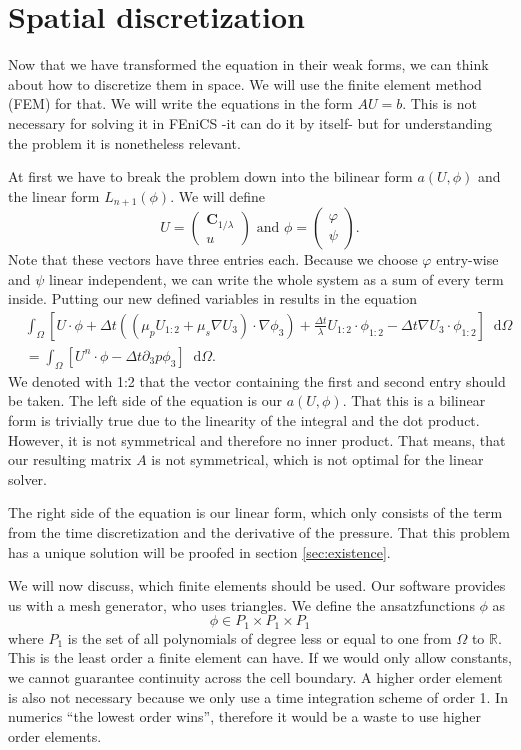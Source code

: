 \documentclass[12pt,a4paper,twoside, open=right]{scrreprt}
\theoremstyle{definition}
\theoremstyle{plain}
\newcommand{\rr}{\mathbb{R}}
\newcommand{\bfC}{\bm{C}}
\newcommand{\D}{\mathop{}\!\mathrm{d}}
\begin{document}
\section{Spatial discretization}
Now that we have transformed the equation in their weak forms, we can think about how to discretize them in space. We will use the finite element method (FEM) for that. We will write the equations in the form $AU=b$. This is not necessary for solving it in FEniCS -it can do it by itself- but for understanding the problem it is nonetheless relevant. 
\par 
At first we have to break the problem down into the bilinear form $a(U,\phi)$ and the linear form $L_{n+1}(\phi)$. We will define 
\begin{equation}
   U=\begin{pmatrix}
   \bfC_{1/\lambda}\\u
   \end{pmatrix} \text{ and } 
   \phi=\begin{pmatrix}
   \varphi\\\psi
   \end{pmatrix}.
\end{equation}
Note that these vectors have three entries each. Because we choose $\varphi$ entry-wise and $\psi$ linear independent, we can write the whole system as a sum of every term inside. Putting our new defined variables in results in the equation
\begin{align}
    &\int_\Omega[U\cdot\phi+\Delta t((\mu_pU_{1:2}+\mu_s\nabla U_3)\cdot\nabla\phi_3)+\frac{\Delta t}{\lambda}U_{1:2}\cdot\phi_{1:2}-\Delta t\nabla U_3\cdot\phi_{1:2}]\D\Omega\\
    &=\int_\Omega [U^n\cdot\phi-\Delta t\partial_3 p\phi_3]\D\Omega.
\end{align}
We denoted with 1:2 that the vector containing the first and second entry should be taken. The left side of the equation is our $a(U,\phi)$. That this is a bilinear form is trivially true due to the linearity of the integral and the dot product. However, it is not symmetrical and therefore no inner product. That means, that our resulting matrix $A$ is not symmetrical, which is not optimal for the linear solver.\par 
The right side of the equation is our linear form, which only consists of the term from the time discretization and the derivative of the pressure. That this problem has a unique solution will be proofed in section \ref{sec:existence}. \par 
We will now discuss, which finite elements should be used. Our software provides us with a mesh generator, who uses triangles. We define the ansatzfunctions $\phi$ as
\begin{equation}
    \phi\in P_1\times P_1\times P_1
\end{equation}
where $P_1$ is the set of all polynomials of degree less or equal to one from $\Omega$ to $\rr$. This is the least order a finite element can have. If we would only allow constants, we cannot guarantee continuity across the cell boundary. A higher order element is also not necessary because we only use a time integration scheme of order 1. In numerics \enquote{the lowest order wins}, therefore it would be a waste to use higher order elements.
\end{document}
